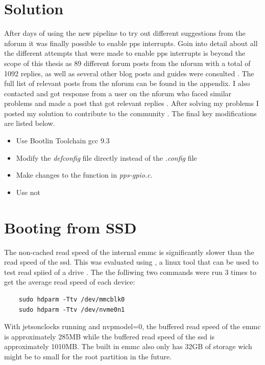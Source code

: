 \section{Solution}
After days of using the new pipeline to try out different suggestions from the \gls{nforum} it was finally possible to enable \gls{pps} interrupts.
Goin into detail about all the different attempts that were made to enable \gls{pps} interrupts is beyond the scope of this thesis as 89 different forum posts from the \gls{nforum} with a total of 1092 replies, as well as several other blog posts and guides were consulted \cite{nvidiaNVIDIAJetsonLinux2023} \cite{nvidiaNVIDIATEGRALINUX} \cite{nvidiaNVIDIAJetsonLinux} \cite{nulizhuanzhuAGXXavier35} \cite{fishotterprojectEnablePpsSupport}.
The full list of relevant posts from the \gls{nforum} can be found in the appendix.
I also contacted and got response from a user on the \gls{nforum} who faced similar problems \cite{mhtechdevProgressPPS2023} and made a post that got relevant replies \cite{martensEnablePPSJetson2023}.
After solving my problems I posted my solution to contribute to the community \cite{martensEnablePPSJetson2023}.
The final key modifications are listed below.
\begin{itemize}
    \item Use Bootlin Toolchain gcc 9.3
    \item Modify the \textit{defconfig} file directly instead of the \textit{.config} file
    \item Make changes to the  function in \textit{pps-gpio.c}.
    \item Use  not 
\end{itemize}





\section{Booting from SSD}
The non-cached read speed of the internal \gls{emmc} is significantly slower than the read speed of the \gls{ssd}.
This was evaluated using , a linux tool that can be used to test read spiied of a drive \cite{lordHdparmLinuxManual2018}.
The the folliwing two commands were run 3 times to get the average read speed of each device:
\begin{verbatim}
    sudo hdparm -Ttv /dev/mmcblk0 
    sudo hdparm -Ttv /dev/nvme0n1 
\end{verbatim}
With \gls{jetsonclocks} running and \gls{nvpmodel}=0, the buffered read speed of the \gls{emmc} is approximately 285MB while the buffered read speed of the \gls{ssd} is approximately 1010MB.
The built in \gls{emmc} also only has 32GB of storage \cite{nvidiaNVIDIAJetsonAGX2019} wich might be to small for the root partition in the future.

